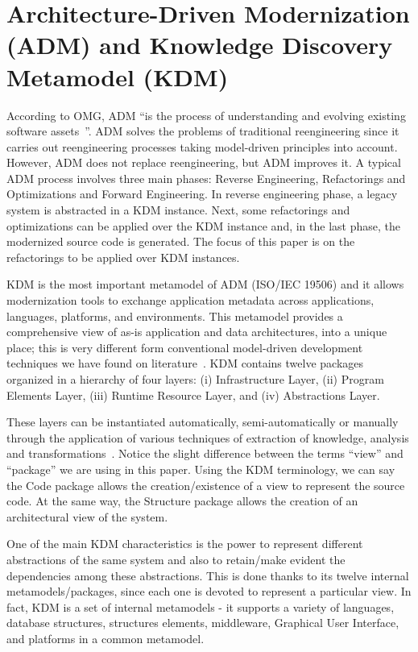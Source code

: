 
\section{Architecture-Driven Modernization (ADM) and Knowledge Discovery Metamodel (KDM)} %
\label{sec:background}

According to OMG, ADM ``is the process of understanding and evolving existing software assets~\cite{1686216}''. ADM solves the problems of traditional reengineering since it carries out reengineering processes taking model-driven principles into account. However, ADM does not replace reengineering, but ADM improves it. A typical ADM process involves three main phases: Reverse Engineering, Refactorings and Optimizations and Forward Engineering.  In reverse engineering phase, a legacy system is abstracted in a KDM instance. Next, some refactorings and optimizations can be applied over the KDM instance and, in the last phase, the modernized source code is generated. The focus of this paper is on the refactorings to be applied over KDM instances.  

KDM is the most important metamodel of ADM (ISO/IEC 19506) and it allows modernization tools to exchange application metadata across applications, languages, platforms, and environments. This metamodel provides a comprehensive view of as-is application and data architectures, into a unique place; this is very different form conventional model-driven development techniques we have found on literature~\cite{7051941, Perez-Castillo:2011:KDM}. KDM contains twelve packages organized in a hierarchy of four layers: (i) Infrastructure Layer, (ii) Program Elements Layer, (iii) Runtime Resource Layer, and (iv) Abstractions Layer.

These layers can be instantiated automatically, semi-automatically or manually through the application of various techniques of extraction of knowledge, analysis and transformations~\cite{OMGADM}. Notice the slight difference between the terms ``view'' and ``package'' we are using in this paper. Using the KDM terminology, we can say the Code package allows the creation/existence of a view to represent the source code. At the same way, the Structure package allows the creation of an architectural view of the system. 

One of the main KDM characteristics is the power to represent different abstractions of the same system and also to retain/make evident the dependencies among these abstractions. This is done thanks to its twelve internal metamodels/packages, since each one is devoted to represent a particular view. In fact, KDM is a set of internal metamodels - it supports a variety of languages, database structures, structures elements, middleware, Graphical User Interface, and platforms in a common metamodel.

